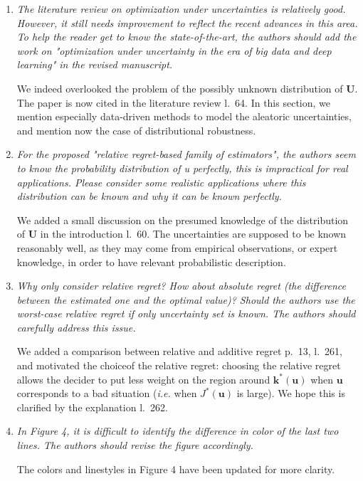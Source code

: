 \documentclass[a4paper,11pt]{article}
\begin{document}
\begin{enumerate}
  
\item \textit{The literature review on optimization under uncertainties is relatively good. However, it still needs improvement to reflect the recent advances in this area. To help the reader get to know the state-of-the-art, the authors should add the work on "optimization under uncertainty in the era of big data and deep learning" in the revised manuscript.
  }

  We indeed overlooked the problem of the possibly unknown distribution of $\mathbf{U}$. The paper is now cited in the literature review l.~64. In this section, we mention especially data-driven methods to model the aleatoric uncertainties, and mention now the case of distributional robustness.

  
\item \textit{For the proposed "relative regret-based family of estimators", the authors seem to know the probability distribution of u perfectly, this is impractical for real applications. Please consider some realistic applications where this distribution can be known and why it can be known perfectly.
  }

  We added a small discussion on the presumed knowledge of the distribution of $\mathbf{U}$ in the introduction l.~60. The  uncertainties are supposed to be known reasonably well, as they may come from empirical observations, or expert knowledge, in order to have relevant probabilistic description.
  
\item \textit{Why only consider relative regret? How about absolute regret (the difference between the estimated one and the optimal value)? Should the authors use the worst-case relative regret if only uncertainty set is known. The authors should carefully address this issue.}

  We added a comparison between relative and additive regret p.~13, l.~261, and motivated the choiceof the relative regret: choosing the relative regret allows the decider to put less weight on the region around $\mathbf{k}^*(\mathbf{u})$ when $\mathbf{u}$ corresponds to a bad situation (\textit{i.e.} when $J^*(\mathbf{u})$ is large). We hope this is clarified by the explanation l.~262.
  
\item \textit{In Figure 4, it is difficult to identify the difference in color of the last two lines. The authors should revise the figure accordingly.}
  
  The colors and linestyles in Figure 4 have been updated for more clarity.
  

\end{enumerate}
\end{document}
